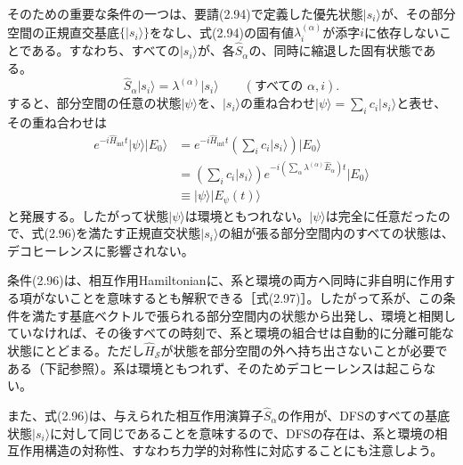 そのための重要な条件の一つは、要請(2.94)で定義した優先状態$\lvert s_i\rangle$が、その部分空間の正規直交基底$\{\lvert s_i\rangle\}$をなし、式(2.94)の固有値$\lambda_i^{(\alpha)}$が添字$i$に依存しないことである。すなわち、すべての$\lvert s_i\rangle$が、各$\hat S_\alpha$の、同時に縮退した固有状態である。
\begin{equation}\hat S_\alpha\lvert s_i\rangle=\lambda^{(\alpha)}\lvert s_i\rangle\qquad(\text{すべての }\alpha,i).\tag{2.96}\end{equation}
すると、部分空間の任意の状態$\lvert\psi\rangle$を、$\lvert s_i\rangle$の重ね合わせ$\lvert\psi\rangle=\sum_i c_i\lvert s_i\rangle$と表せ、その重ね合わせは
\begin{equation}\begin{split}e^{-i\hat H_{\mathrm{int}}t}\lvert\psi\rangle\lvert E_0\rangle&=e^{-i\hat H_{\mathrm{int}}t}\left(\sum_i c_i\lvert s_i\rangle\right)\lvert E_0\rangle\\&=\left(\sum_i c_i\lvert s_i\rangle\right)e^{-i(\sum_\alpha\lambda^{(\alpha)}\hat E_\alpha)t}\lvert E_0\rangle\\&\equiv\lvert\psi\rangle\lvert E_\psi(t)\rangle\end{split}\tag{2.97}\end{equation}
と発展する。したがって状態$\lvert\psi\rangle$は環境ともつれない。$\lvert\psi\rangle$は完全に任意だったので、式(2.96)を満たす正規直交状態$\lvert s_i\rangle$の組が張る部分空間内のすべての状態は、デコヒーレンスに影響されない。

条件(2.96)は、相互作用Hamiltonianに、系と環境の両方へ同時に非自明に作用する項がないことを意味するとも解釈できる［式(2.97)］。したがって系が、この条件を満たす基底ベクトルで張られる部分空間内の状態から出発し、環境と相関していなければ、その後すべての時刻で、系と環境の組合せは自動的に分離可能な状態にとどまる。ただし$\hat H_{\mathcal S}$が状態を部分空間の外へ持ち出さないことが必要である（下記参照）。系は環境ともつれず、そのためデコヒーレンスは起こらない。

\hypertarget{srcpage:80}{}\label{srcpage:80}
また、式(2.96)は、与えられた相互作用演算子$\hat S_\alpha$の作用が、DFSのすべての基底状態$\lvert s_i\rangle$に対して同じであることを意味するので、DFSの存在は、系と環境の相互作用構造の対称性、すなわち力学的対称性に対応することにも注意しよう。

